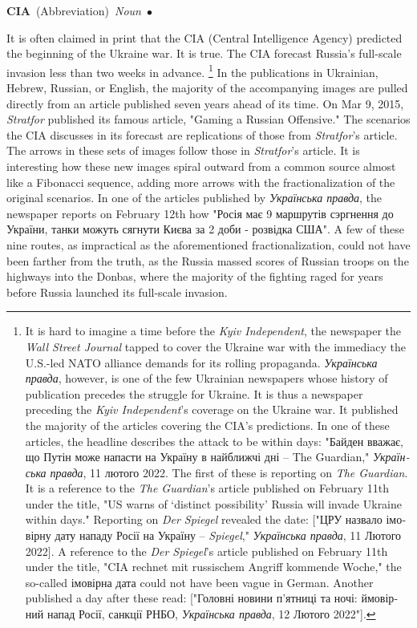 \documentclass[10pt,a4paper,twoside]{article} %
\newcommand{\entry}[4]{\markboth{#1}{#1}\textbf{#1}\ {(#2)}\ \textit{#3}\ $\bullet$\ {#4}}  %
\begin{document}
\begin{multicols}{2}

\entry{CIA} {Abbreviation} {Noun} {

It is often claimed in print that the CIA (Central Intelligence Agency) predicted the beginning of the Ukraine war. It is true. The CIA forecast Russia's full-scale invasion less than two weeks in advance. \footnote{ It is hard to imagine a time before the \emph{Kyiv Independent}, the newspaper the \emph{Wall Street Journal} tapped to cover the Ukraine war with the immediacy the U.S.-led NATO alliance demands for its rolling propaganda. \textukrainian{\emph{Українська правда}}, however, is one of the few Ukrainian newspapers whose history of publication precedes the struggle for Ukraine. It is thus a newspaper preceding the \emph{Kyiv Independent}'s coverage on the Ukraine war. It published the majority of the articles covering the CIA's predictions. In one of these articles, the headline describes the attack to be within days: \textukrainian{"Байден вважає, що Путін може напасти на Україну в найближчі дні} – The Guardian," \textukrainian{\emph{Українська правда}}, 11 \textukrainian{лютого} 2022. The first of these is reporting on \emph{The Guardian}. It is a reference to the \emph{The Guardian}'s article published on February 11th under the title, "US warns of ‘distinct possibility’ Russia will invade Ukraine within days." Reporting on \emph{Der Spiegel} revealed the date: ["\textukrainian{ЦРУ назвало імовірну дату нападу Росії на Україну} – \emph{Spiegel}," \textukrainian{\emph{Українська правда}}, 11 \textukrainian{Лютого} 2022]. A reference to the \emph{Der Spiegel}'s article published on February 11th under the title, "CIA rechnet mit russischem Angriff kommende Woche," the so-called \textukrainian{імовірна дата} could not have been vague in German. Another published a day after these read: ["\textukrainian{Головні новини п’ятниці та ночі: ймовірний напад Росії, санкції РНБО}, \textukrainian{\emph{Українська правда}}, 12 \textukrainian{Лютого} 2022"].} In the publications in Ukrainian, Hebrew, Russian, or English, the majority of the accompanying images are pulled directly from an article published seven years ahead of its time. On Mar 9, 2015, \emph{Stratfor} published its famous article, "Gaming a Russian Offensive." The scenarios the CIA discusses in its forecast are replications of those from \emph{Stratfor}'s article. The arrows in these sets of images follow those in \emph{Stratfor}'s article.  \newline \indent It is interesting how these new images spiral outward from a common source almost like a Fibonacci sequence, adding more arrows with the fractionalization of the original scenarios.  In one of the articles published by \textukrainian{\emph{Українська правда}}, the newspaper reports on February 12th how \textukrainian{"Росія має 9 маршрутів сэргнення до України, танки можуть сягнути Києва за 2 доби - розвідка США"}. A few of these nine routes, as impractical as the aforementioned fractionalization, could not have been farther from the truth, as the Russia massed scores of Russian troops on the highways into the Donbas, where the majority of the fighting raged for years before Russia launched its full-scale invasion. }
\end{multicols}
\end{document}
